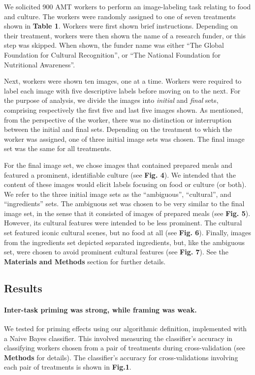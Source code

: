 \documentclass[letterpaper,twocolumn]{article}
\begin{document}
We solicited 900 AMT workers to perform an image-labeling task relating to
food and culture.  The workers were randomly assigned to one of seven 
treatments shown in \textbf{Table 1}.  Workers were first shown brief 
instructions.  Depending on their treatment, workers were then shown the 
name of a research funder, or this step was skipped.  When shown, 
the funder name was either
``The Global Foundation for Cultural Recognition'', or 
``The National Foundation for Nutritional Awareness''.  

Next, workers were
shown ten images, one at a time. Workers were required to label each image 
with five descriptive labels before moving on to the next.  For the purpose 
of analysis, we divide the images
into \textit{initial} and \textit{final} sets, comprising respectively the 
first five and last five images shown.  As mentioned, from the perspective of 
the worker, there was no 
distinction or interruption between the initial and final sets. 
Depending on the treatment to which the worker was assigned, one of three 
initial image sets was chosen. The final image set was the same for all 
treatments.

For the final image set, we chose 
images that contained prepared meals and featured a prominent, identifiable 
culture (see \textbf{Fig. 4}).  We intended that the content of these images 
would elicit labels focusing on food or culture (or both).
We refer to the three initial image sets as the ``ambiguous'', ``cultural'', 
and ``ingredients'' sets.  The ambiguous set was chosen to
be very similar to the final image set, in the sense that it consisted of
images of prepared meals (see \textbf{Fig. 5}).  However, its cultural 
features were intended to be less prominent.  The cultural set featured 
iconic cultural scenes, but no food at all (see \textbf{Fig. 6}).  Finally, 
images from the 
ingredients set depicted separated ingredients, but, 
like the ambiguous set, were chosen to avoid prominent cultural features (see 
\textbf{Fig. 7}).  See the \textbf{Materials and Methods} section for further 
details.

\subsection*{Results}
\paragraph{Inter-task priming was strong, while framing was weak.}
We tested for priming effects using our algorithmic definition, implemented 
with a Naive Bayes classifier.  This involved measuring the classifier's 
accuracy in classifying workers chosen from a pair of treatments during 
cross-validation (see \textbf{Methods} for details).  The classifier's accuracy
for cross-validations involving each pair of treatments is shown in 
\textbf{Fig.1}.
\end{document}
